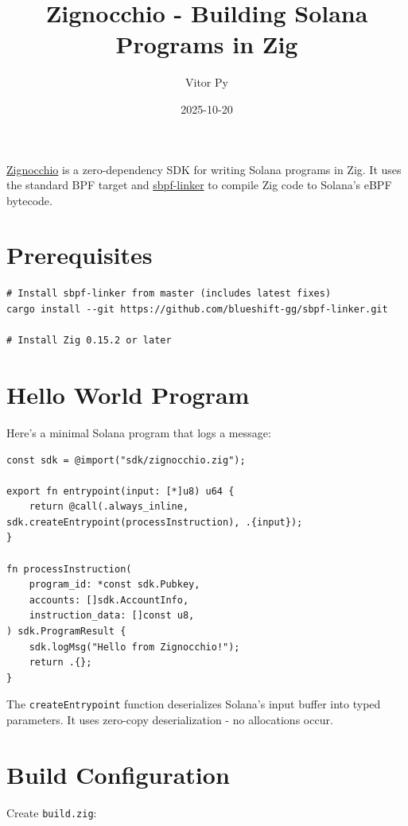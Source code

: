 \documentclass{article}
\title{Zignocchio - Building Solana Programs in Zig}
\author{Vitor Py}
\date{2025-10-20}
\begin{document}

\maketitle

\href{https://github.com/vitorpy/zignocchio}{Zignocchio} is a zero-dependency SDK for writing Solana programs in Zig. It uses the standard BPF target and \href{https://github.com/blueshift-gg/sbpf-linker}{sbpf-linker} to compile Zig code to Solana's eBPF bytecode.

\section{Prerequisites}

\begin{verbatim}
# Install sbpf-linker from master (includes latest fixes)
cargo install --git https://github.com/blueshift-gg/sbpf-linker.git

# Install Zig 0.15.2 or later
\end{verbatim}

\section{Hello World Program}

Here's a minimal Solana program that logs a message:

\begin{verbatim}
const sdk = @import("sdk/zignocchio.zig");

export fn entrypoint(input: [*]u8) u64 {
    return @call(.always_inline, sdk.createEntrypoint(processInstruction), .{input});
}

fn processInstruction(
    program_id: *const sdk.Pubkey,
    accounts: []sdk.AccountInfo,
    instruction_data: []const u8,
) sdk.ProgramResult {
    sdk.logMsg("Hello from Zignocchio!");
    return .{};
}
\end{verbatim}

The \texttt{createEntrypoint} function deserializes Solana's input buffer into typed parameters. It uses zero-copy deserialization - no allocations occur.

\section{Build Configuration}

Create \texttt{build.zig}:
\end{document}
